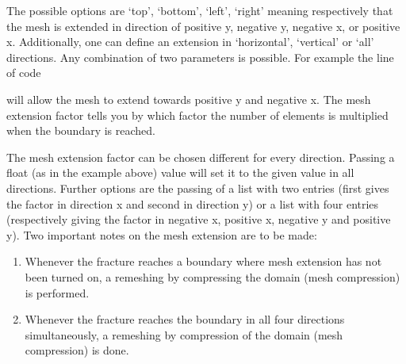 \documentclass[letterpaper,10pt,english]{sphinxmanual}
\begin{document}
\begin{sphinxVerbatim}[commandchars=\\\{\}]
\PYG{p}{[}\PYG{p}{]}
\end{sphinxVerbatim}

\sphinxAtStartPar
The possible options are ‘top’, ‘bottom’, ‘left’, ‘right’ meaning respectively that the mesh is extended in direction
of positive y, negative y, negative x, or positive x. Additionally, one can define an extension in ‘horizontal’,
‘vertical’ or ‘all’ directions. Any combination of two parameters is possible. For example the line of code

\begin{sphinxVerbatim}[commandchars=\\\{\}]
\PYG{p}{[} \PYG{p}{]}
\end{sphinxVerbatim}

\sphinxAtStartPar
will allow the mesh to extend towards positive y and negative x. The mesh extension factor tells you by which factor
the number of elements is multiplied when the boundary is reached.

\begin{sphinxVerbatim}[commandchars=\\\{\}]
\end{sphinxVerbatim}

\sphinxAtStartPar
The mesh extension factor can be chosen different for every direction. Passing a float (as in the example above) value
will set it to the given value in all directions. Further options are the passing of a list with two entries (first
gives the factor in direction x and second in direction y) or a list with four entries (respectively giving the factor
in negative x, positive x, negative y and positive y). Two important notes on the mesh extension are to be made:
\begin{enumerate}
%
\item {} 
\sphinxAtStartPar
Whenever the fracture reaches a boundary where mesh extension has not been turned on, a re\sphinxhyphen{}meshing by compressing the
domain (mesh compression) is performed.

\item {} 
\sphinxAtStartPar
Whenever the fracture reaches the boundary in all four directions simultaneously, a re\sphinxhyphen{}meshing by compression of
the domain (mesh compression) is done.

\end{enumerate}
\end{document}
